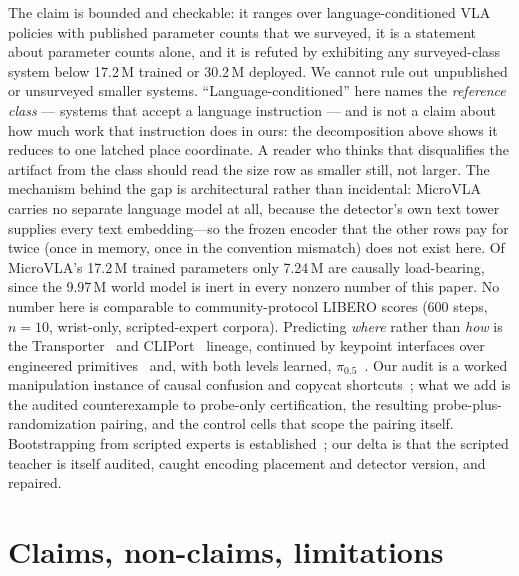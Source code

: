 \documentclass[10pt,letterpaper]{article}
\begin{document}
The claim is bounded and checkable: it ranges over language-conditioned VLA
policies with published parameter counts that we surveyed, it is a statement
about parameter counts alone, and it is refuted by exhibiting any surveyed-class
system below 17.2\,M trained or 30.2\,M deployed. We cannot rule out
unpublished or unsurveyed smaller systems. ``Language-conditioned'' here names
the \emph{reference class} --- systems that accept a language instruction ---
and is not a claim about how much work that instruction does in ours: the
decomposition above shows it reduces to one latched place coordinate. A reader
who thinks that disqualifies the artifact from the class should read the size
row as smaller still, not larger. The mechanism behind the gap is
architectural rather than incidental: MicroVLA carries no separate language
model at all, because the detector's own text tower supplies every text
embedding---so the frozen encoder that the other rows pay for twice (once in
memory, once in the convention mismatch) does not exist here. Of MicroVLA's
17.2\,M trained parameters only 7.24\,M are causally load-bearing, since the
9.97\,M world model is inert in every nonzero number of this paper.
No number here is comparable to
community-protocol LIBERO scores (600 steps, $n{=}10$, wrist-only,
scripted-expert corpora). Predicting \emph{where} rather than \emph{how} is
the Transporter~\citep{zeng2020transporter} and CLIPort~\citep{shridhar2021cliport}
lineage, continued by keypoint interfaces over engineered
primitives~\citep{liu2024moka,huang2023voxposer} and, with both levels
learned, $\pi_{0.5}$~\citep{black2025pi05}. Our audit is a worked manipulation
instance of causal confusion and copycat
shortcuts~\citep{dehaan2019causal,wen2020copycat,bansal2018chauffeurnet};
what we add is the audited counterexample to probe-only certification, the
resulting probe-plus-randomization pairing, and the control cells that scope
the pairing itself. Bootstrapping from scripted experts is
established~\citep{mandlekar2023mimicgen}; our delta is that the scripted
teacher is itself audited, caught encoding placement and detector version, and
repaired.

\section{Claims, non-claims, limitations}
\end{document}
